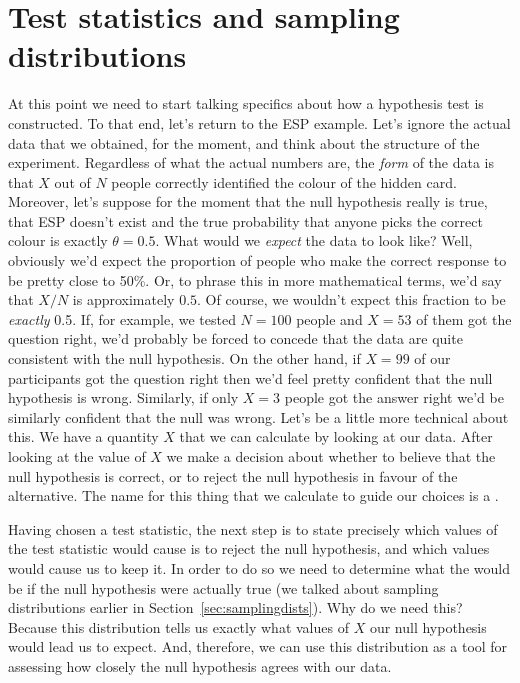 \section{Test statistics and sampling distributions~\label{sec:teststatistics}} 

At this point we need to start talking specifics about how a hypothesis test is constructed. To that end, let's return to the ESP example. Let's ignore the actual data that we obtained, for the moment, and think about the structure of the experiment. Regardless of what the actual numbers are, the {\it form} of the data is that $X$ out of $N$ people correctly identified the colour of the hidden card. Moreover, let's suppose for the moment that the null hypothesis really is true, that ESP doesn't exist and the true probability that anyone picks the correct colour is exactly $\theta = 0.5$. What would we {\it expect} the data to look like? Well, obviously we'd expect the proportion of people who make the correct response to be pretty close to 50\%. Or, to phrase this in more mathematical terms, we'd say that $X/N$ is approximately $0.5$. Of course, we wouldn't expect this fraction to be {\it exactly} 0.5. If, for example, we tested $N=100$ people and $X = 53$ of them got the question right, we'd probably be forced to concede that the data are quite consistent with the null hypothesis. On the other hand, if $X = 99$ of our participants got the question right then we'd feel pretty confident that the null hypothesis is wrong. Similarly, if only $X=3$ people got the answer right we'd be similarly confident that the null was wrong. Let's be a little more technical about this. We have a quantity $X$ that we can calculate by looking at our data. After looking at the value of $X$ we make a decision about whether to believe that the null hypothesis is correct, or to reject the null hypothesis in favour of the alternative. The name for this thing that we calculate to guide our choices is a . 

Having chosen a test statistic, the next step is to state precisely which values of the test statistic would cause is to reject the null hypothesis, and which values would cause us to keep it. In order to do so we need to determine what the  would be if the null hypothesis were actually true (we talked about sampling distributions earlier in Section~\ref{sec:samplingdists}). Why do we need this? Because this distribution tells us exactly what values of $X$ our null hypothesis would lead us to expect. And, therefore, we can use this distribution as a tool for assessing how closely the null hypothesis agrees with our data. 

